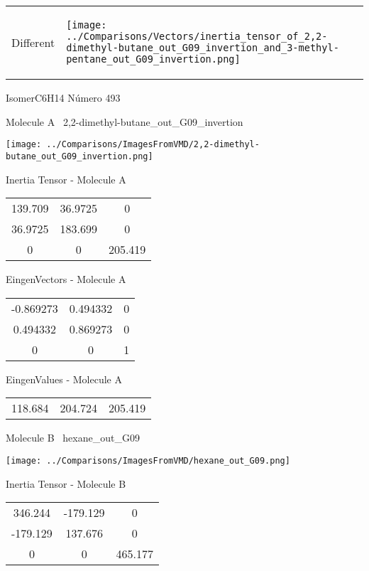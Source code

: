 \vtab[-5mm]
\begin{tabular}{*{2}{m{}}}
\begin{center}
\textcolor{NavyBlue}{\Large Different}
\end{center}
&
\begin{center}
\texttt{[image: ../Comparisons/Vectors/inertia\_tensor\_of\_2,2-dimethyl-butane\_out\_G09\_invertion\_and\_3-methyl-pentane\_out\_G09\_invertion.png]}
\end{center}
\end{tabular}

 \newpage

\vtab[-3cm]
\begin{center}
{\large IsomerC6H14 \tab Número 493}
\end{center}
\begin{multicols}{2}
\begin{center}

Molecule A \
2,2-dimethyl-butane\_out\_G09\_invertion

\texttt{[image: ../Comparisons/ImagesFromVMD/2,2-dimethyl-butane\_out\_G09\_invertion.png]}

Inertia Tensor - Molecule A \\
\begin{tabular}{|c c c|}
139.709	 & 	36.9725	 & 	0	 \\
36.9725	 & 	183.699	 & 	0	 \\
0	 & 	0	 & 	205.419
\end{tabular}

\vtab
 EingenVectors - Molecule A     \\
\begin{tabular}{|c c c|}
-0.869273	 & 	0.494332	 & 	0	 \\
0.494332	 & 	0.869273	 & 	0	 \\
0	 & 	0	 & 	1
\end{tabular}

\vtab
 EingenValues - Molecule A     \\
\begin{tabular}{|c c c|}
118.684	 & 	204.724	 & 	205.419	 \\
\end{tabular}
\columnbreak

Molecule B \
hexane\_out\_G09

\texttt{[image: ../Comparisons/ImagesFromVMD/hexane\_out\_G09.png]}

Inertia Tensor - Molecule B \\
\begin{tabular}{|c c c|}
346.244	 & 	-179.129	 & 	0	 \\
-179.129	 & 	137.676	 & 	0	 \\
0	 & 	0	 & 	465.177
\end{tabular}


\end{center}
\end{multicols}
